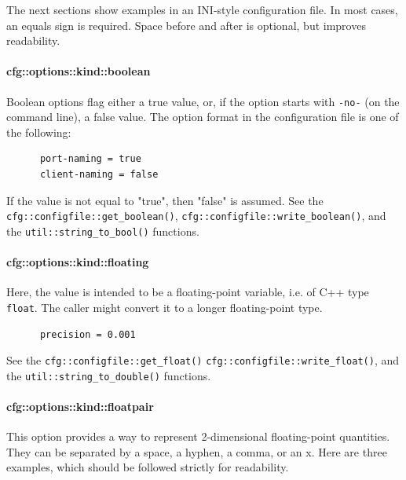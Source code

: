    The next sections show examples in an INI-style configuration file.
   In most cases, an equals sign is required.
   Space before and after is optional, but improves readability.

\paragraph{cfg::options::kind::boolean}
\label{paragraph:cfg_namespace_options_kind_boolean}

   Boolean options flag either a true value, or, if the option
   starts with \texttt{-\-no-} (on the command line), a false value.
   The option format in the configuration file is one of the following:

   \begin{verbatim}
      port-naming = true
      client-naming = false
   \end{verbatim}

   If the value is not equal to "true", then "false" is assumed.
   See the \texttt{cfg::configfile::get\_boolean()},
   \texttt{cfg::configfile::write\_boolean()},
   and the \texttt{util::string\_to\_bool()} functions.

\paragraph{cfg::options::kind::floating}
\label{paragraph:cfg_namespace_options_kind_floating}

   Here, the value is intended to be a floating-point variable,
   i.e. of C++ type \texttt{float}.
   The caller might convert it to a longer floating-point type.

   \begin{verbatim}
      precision = 0.001
   \end{verbatim}

   See the \texttt{cfg::configfile::get\_float()}
   \texttt{cfg::configfile::write\_float()},
   and the \texttt{util::string\_to\_double()} functions.

\paragraph{cfg::options::kind::floatpair}
\label{paragraph:cfg_namespace_options_kind_floatpair}

   This option provides a way to represent 2-dimensional
   floating-point quantities.
   They can be separated by a space, a hyphen, a comma, or an x.
   Here are three examples, which should be followed
   strictly for readability.

